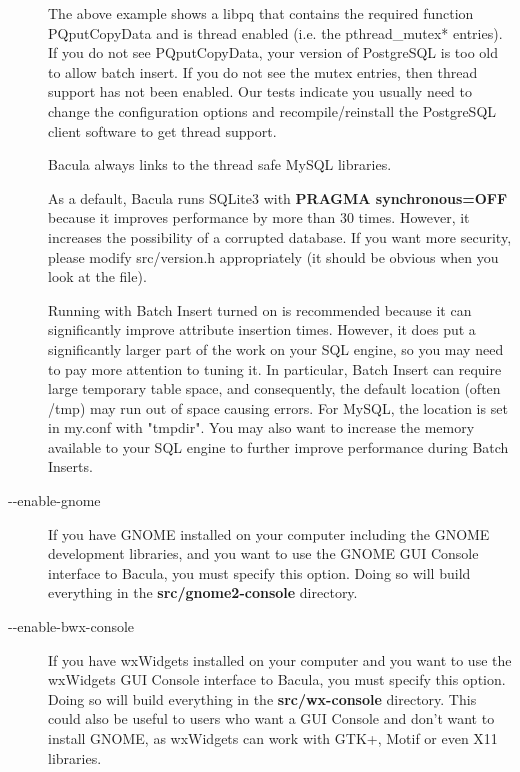 \begin{description}
   The above example shows a libpq that contains the required function
   PQputCopyData and is thread enabled (i.e. the pthread\_mutex* entries).
   If you do not see PQputCopyData, your version of PostgreSQL is too old
   to allow batch insert.  If you do not see the mutex entries, then thread
   support has not been enabled. Our tests indicate you usually need to
   change the configuration options and recompile/reinstall the PostgreSQL
   client software to get thread support.

   Bacula always links to the thread safe MySQL libraries.

   As a default, Bacula runs SQLite3 with {\bf PRAGMA synchronous=OFF}
   because it improves performance by more than 30 times. However, it 
   increases the possibility of a corrupted database. If you want more
   security, please modify src/version.h appropriately (it should be
   obvious when you look at the file).

   Running with Batch Insert turned on is recommended because it can
   significantly improve attribute insertion times. However, it does 
   put a significantly larger part of the work on your SQL engine, so
   you may need to pay more attention to tuning it. In particular,   
   Batch Insert can require large temporary table space, and consequently,
   the default location (often /tmp) may run out of space causing errors.
   For MySQL, the location is set in my.conf with "tmpdir".  You may also
   want to increase the memory available to your SQL engine to further
   improve performance during Batch Inserts.

\item [ {-}{-}enable-gnome ]
   If you have GNOME installed on your computer including the
   GNOME development libraries, and you want to use the
   GNOME GUI Console interface to Bacula, you must specify this option.
   Doing so will build everything in the {\bf src/gnome2-console} directory.

\item [ {-}{-}enable-bwx-console ]
   If you have wxWidgets installed on your computer and you want to use the
   wxWidgets GUI Console interface to Bacula, you must specify this option.
   Doing so will build everything in the {\bf src/wx-console} directory.
   This could also be useful to users who want a GUI Console and don't want
   to install GNOME, as wxWidgets can work with GTK+, Motif or even X11
   libraries.


\end{description}
